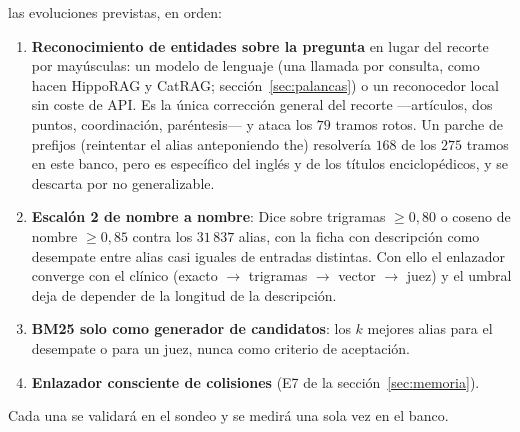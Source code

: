\documentclass[11pt,a4paper]{article}
\begin{document}
las evoluciones previstas, en orden:
\begin{enumerate}[leftmargin=1.8em, itemsep=1pt, label=L\arabic*.]
\item \textbf{Reconocimiento de entidades sobre la pregunta} en lugar del
  recorte por mayúsculas: un modelo de lenguaje (una llamada por
  consulta, como hacen HippoRAG y CatRAG; sección~\ref{sec:palancas}) o
  un reconocedor local sin coste de API. Es la única corrección general
  del recorte ---artículos, dos puntos, coordinación, paréntesis--- y
  ataca los $79$ tramos rotos. Un parche de prefijos (reintentar el alias
  anteponiendo \guillemotleft{}the\guillemotright{}) resolvería $168$ de los $275$ tramos en este
  banco, pero es específico del inglés y de los títulos enciclopédicos, y
  se descarta por no generalizable.
\item \textbf{Escalón 2 de nombre a nombre}: Dice sobre trigramas
  $\ge 0{,}80$ o coseno de nombre $\ge 0{,}85$ contra los $31\,837$ alias,
  con la ficha con descripción como desempate entre alias casi iguales
  de entradas distintas. Con ello el enlazador converge con el clínico
  (exacto $\to$ trigramas $\to$ vector $\to$ juez) y el umbral deja de
  depender de la longitud de la descripción.
\item \textbf{BM25 solo como generador de candidatos}: los $k$ mejores
  alias para el desempate o para un juez, nunca como criterio de
  aceptación.
\item \textbf{Enlazador consciente de colisiones} (E7 de la
  sección~\ref{sec:memoria}).
\end{enumerate}
Cada una se validará en el sondeo y se medirá una sola vez en el banco.
\end{document}
